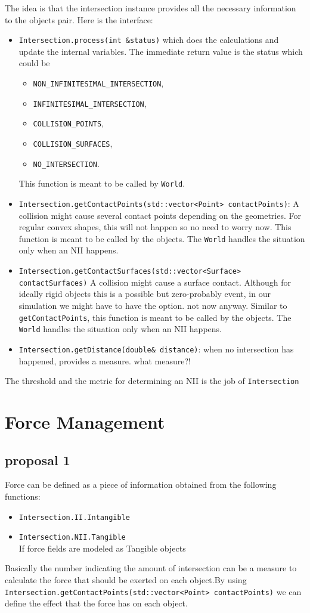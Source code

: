 \documentclass[a4paper]{report}
\newcommand{\cm}[1]{{\color{red}#1}}
\begin{document}
The idea is that the intersection instance provides all the necessary information to the objects pair. Here is the interface:
\begin{itemize}
	\item \verb+Intersection.process(int &status)+ which does the calculations and update the internal variables. The immediate return value is the status which could be 
	\begin{itemize}
		\item \verb+NON_INFINITESIMAL_INTERSECTION+,
		\item \verb+INFINITESIMAL_INTERSECTION+,
		\item \verb+COLLISION_POINTS+, 
		\item \verb+COLLISION_SURFACES+, 
		\item \verb+NO_INTERSECTION+.
	\end{itemize}
	This function is meant to be called by \verb+World+.
	\item \verb+Intersection.getContactPoints(std::vector<Point> contactPoints)+: A collision might cause several contact points depending on the geometries. \cm{For regular convex shapes, this will not happen so no need to worry now.} This function is meant to be called by the objects. The \verb+World+ handles the situation only when an NII happens.
	\item \verb+Intersection.getContactSurfaces(std::vector<Surface> contactSurfaces)+ A collision might cause a surface contact. Although for ideally rigid objects this is a possible but zero-probably event, in our simulation we might have to have the option. \cm{not now anyway.} Similar to \verb+getContactPoints+, this function is meant to be called by the objects. The \verb+World+ handles the situation only when an NII happens.
	\item \verb+Intersection.getDistance(double& distance)+: when no intersection has happened, provides a measure. \cm{what measure?!}
\end{itemize}

The threshold and the metric for determining an NII is the job of \verb+Intersection+ 

\chapter{Force Management}
\label{chap:Force Management}
\section{proposal 1}
Force can be defined as a piece of information obtained from the following functions: 
\begin{itemize}
	\item \verb+Intersection.II.Intangible+
	\item \verb+Intersection.NII.Tangible+ \\
	 \cm{If force fields are modeled as Tangible objects}
\end{itemize}
Basically the number indicating the amount of intersection can be a measure to calculate the force that should be exerted on each object.By using \verb+Intersection.getContactPoints(std::vector<Point> contactPoints)+ we can define the effect that the force has on each object.
\end{document}
